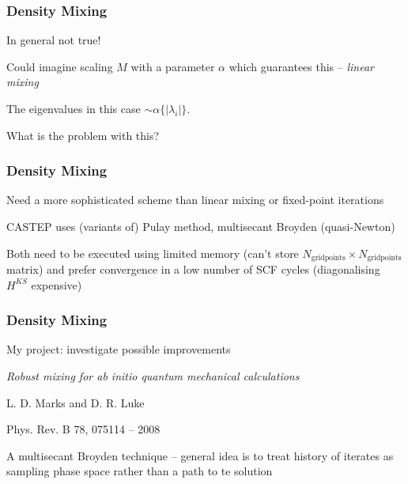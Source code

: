 \documentclass{beamer}
\begin{document}
\begin{frame}

\frametitle{Density Mixing}

In general not true!

\vspace{0.6cm}

Could imagine scaling $M$ with a parameter $\alpha$ which guarantees this -- \textit{linear mixing}

\vspace{0.6cm}

The eigenvalues in this case $\sim \alpha \{ | \lambda_i | \}$.

\vspace{0.6cm}

What is the problem with this?

\end{frame}




\begin{frame}

\frametitle{Density Mixing}

Need a more sophisticated scheme than linear mixing or fixed-point iterations

\vspace{0.6cm}

CASTEP uses (variants of) Pulay method, multisecant Broyden (quasi-Newton)

\vspace{0.6cm}

Both need to be executed using limited memory (can't store $N_{\text{gridpoints}} \times N_{\text{gridpoints}}$ matrix) 
and prefer convergence in a low number of SCF cycles (diagonalising $H^{KS}$ expensive)

\vspace{0.6cm}


\end{frame}

\begin{frame}

\frametitle{Density Mixing}

My project: investigate possible improvements

\vspace{0.6cm}

\textit{Robust mixing for ab initio quantum mechanical calculations}

L. D. Marks and D. R. Luke

Phys. Rev. B 78, 075114 – 2008

\vspace{0.6cm}

A multisecant Broyden technique -- general idea is to treat history of iterates as sampling phase space rather than a path to te solution

\vspace{0.6cm}


\end{frame}
\end{document}
